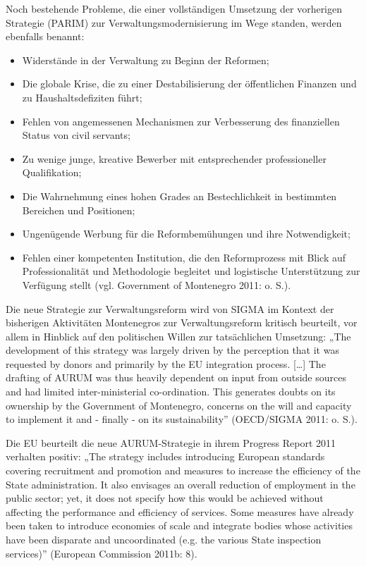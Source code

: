 Noch bestehende Probleme, die einer vollständigen Umsetzung der vorherigen Strategie (PARIM) zur Verwaltungsmodernisierung im Wege standen, werden ebenfalls benannt:
\begin{itemize}
\item Widerstände in der Verwaltung zu Beginn der Reformen;
\item Die globale Krise, die zu einer Destabilisierung der öffentlichen Finanzen und zu Haushaltsdefiziten führt;
\item Fehlen von angemessenen Mechanismen zur Verbesserung des finanziellen Status von civil servants;
\item Zu wenige junge, kreative Bewerber mit entsprechender professioneller Qualifikation;
\item Die Wahrnehmung eines hohen Grades an Bestechlichkeit in bestimmten Bereichen und Positionen;
\item Ungenügende Werbung für die Reformbemühungen und ihre Notwendigkeit;
\item Fehlen einer kompetenten Institution, die den Reformprozess mit Blick auf Professionalität und Methodologie begleitet und logistische Unterstützung zur Verfügung stellt (vgl. Government of Montenegro 2011: o. S.).
\end{itemize}
Die neue Strategie zur Verwaltungsreform wird von SIGMA im Kontext der bisherigen Aktivitäten Montenegros zur Verwaltungsreform kritisch beurteilt, vor allem in Hinblick auf den politischen Willen zur tatsächlichen Umsetzung: „The development of this strategy was largely driven by the perception that it was requested by donors and primarily by the EU integration process. […] The drafting of AURUM was thus heavily dependent on input from outside sources and had limited inter-ministerial co-ordination. This generates doubts on its ownership by the Government of Montenegro, concerns on the will and capacity to implement it and - finally - on its sustainability” (OECD/SIGMA 2011: o. S.).
\par
Die EU beurteilt die neue AURUM-Strategie in ihrem Progress Report 2011 verhalten positiv: „The strategy includes introducing European standards covering recruitment and promotion and measures to increase the efficiency of the State administration. It also envisages an overall reduction of employment in the public sector; yet, it does not specify how this would be achieved without affecting the performance and efficiency of services. Some measures have already been taken to introduce economies of scale and integrate bodies whose activities have been disparate and uncoordinated (e.g. the various State inspection services)” (European Commission 2011b: 8).\par
